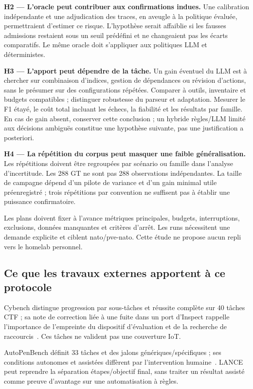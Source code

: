 \documentclass[11pt,a4paper]{article}
\begin{document}
\textbf{H2 --- L'oracle peut contribuer aux confirmations indues.} Une calibration indépendante et une adjudication des traces, en aveugle à la politique évaluée, permettraient d'estimer ce risque. L'hypothèse serait affaiblie si les fausses admissions restaient sous un seuil prédéfini et ne changeaient pas les écarts comparatifs. Le même oracle doit s'appliquer aux politiques LLM et déterministes.

\textbf{H3 --- L'apport peut dépendre de la tâche.} Un gain éventuel du LLM est à chercher sur combinaison d'indices, gestion de dépendances ou révision d'actions, sans le présumer sur des configurations répétées. Comparer à outils, inventaire et budgets compatibles ; distinguer robustesse du parseur et adaptation. Mesurer le F1 étayé, le coût total incluant les échecs, la fiabilité et les résultats par famille. En cas de gain absent, conserver cette conclusion ; un hybride règles/LLM limité aux décisions ambiguës constitue une hypothèse suivante, pas une justification a posteriori.

\textbf{H4 --- La répétition du corpus peut masquer une faible généralisation.} Les répétitions doivent être regroupées par scénario ou famille dans l'analyse d'incertitude. Les 288 GT ne sont pas 288 observations indépendantes. La taille de campagne dépend d'un pilote de variance et d'un gain minimal utile préenregistré ; trois répétitions par convention ne suffisent pas à établir une puissance confirmatoire.

Les plans doivent fixer à l'avance métriques principales, budgets, interruptions, exclusions, données manquantes et critères d'arrêt. Les runs nécessitent une demande explicite et ciblent nato/pve-nato. Cette étude ne propose aucun repli vers le homelab personnel.

\subsection{Ce que les travaux externes apportent à ce protocole}
Cybench distingue progression par sous-tâches et réussite complète sur 40 tâches CTF ; sa note de correction liée à une fuite dans un port d'Inspect rappelle l'importance de l'empreinte du dispositif d'évaluation et de la recherche de raccourcis~\cite{cybench}. Ces tâches ne valident pas une couverture IoT.

AutoPenBench définit 33 tâches et des jalons génériques/spécifiques ; ses conditions autonomes et assistées diffèrent par l'intervention humaine~\cite{autopenbench}. LANCE peut reprendre la séparation étapes/objectif final, sans traiter un résultat assisté comme preuve d'avantage sur une automatisation à règles.
\end{document}
